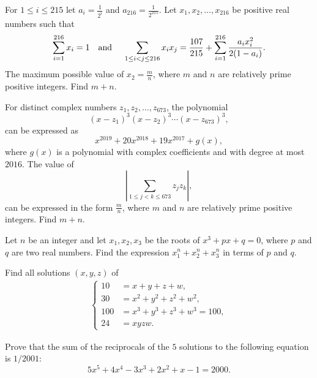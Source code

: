 \begin{question}[name={2016 AIME}]
    For $1\leq i\leq 215$ let $a_i=\frac{1}{2^i}$ and $a_{216}=\frac{1}{2^{215}}$. Let $x_1,x_2,\ldots,x_{216}$ be positive real numbers such that\[ \sum\limits_{i=1}^{216} x_i=1 \text{\quad and \quad} \sum\limits_{1\leq i<j \leq 216} x_ix_j = \frac{107}{215}+ \sum\limits_{i=1}^{216} \frac{a_ix_i^2}{2(1-a_i)}.\]The maximum possible value of $x_2=\frac{m}{n}$, where $m$ and $n$ are relatively prime positive integers. Find $m+n$.
\end{question}


\begin{question}[name={2019 AIME}]
    For distinct complex numbers $z_1,z_2,\dots,z_{673}$, the polynomial
    \[ (x-z_1)^3(x-z_2)^3 \cdots (x-z_{673})^3, \]
    can be expressed as \[x^{2019} + 20x^{2018} + 19x^{2017}+g(x),\] where $g(x)$ is a polynomial with complex coefficients and with degree at most $2016$. The value of
    \[ \left| \sum_{1 \le j <k \le 673} z_jz_k \right|, \] 
    can be expressed in the form $\tfrac{m}{n}$, where $m$ and $n$ are relatively prime positive integers. Find $m+n$.
\end{question}



\begin{question}
    Let $n$ be an integer and let $x_1,x_2,x_3$ be the roots of $x^3+px+q=0$, where $p$ and $q$ are two real numbers. Find the expression $x_1^n+x_2^n +x_3^n$ in terms of $p$ and $q.$
\end{question}

\begin{question}
Find all solutions $(x,y,z)$ of
\begin{align*}
    \begin{cases}
        10  &= x+y+z+w,\\
        30  &= x^2+y^2+z^2+w^2,\\
        100 &= x^3+y^3+z^3+w^3=100,\\
        24  &= xyzw.
    \end{cases}
\end{align*}
\end{question}

\begin{question}
    Prove that the sum of the reciprocals of the $5$ solutions to the following equation is $1/2001$: 
    \[5x^5+4x^4-3x^3+2x^2+x-1=2000.\]
\end{question}

